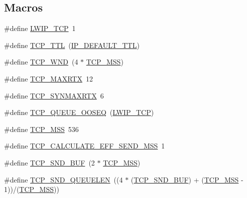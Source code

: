 \subsection*{Macros}
\begin{DoxyCompactItemize}
\item 
\#define \hyperlink{group__lwip__opts__tcp_gaa4ed98deb97b77c633cb8870f34c71e9}{L\+W\+I\+P\+\_\+\+T\+CP}~1
\item 
\#define \hyperlink{group__lwip__opts__tcp_gacd5b25ea81d2894790d25da5393cdab4}{T\+C\+P\+\_\+\+T\+TL}~(\hyperlink{group__lwip__opts__ipv4_ga556b9b58fd02c0fdd126791baef77411}{I\+P\+\_\+\+D\+E\+F\+A\+U\+L\+T\+\_\+\+T\+TL})
\item 
\#define \hyperlink{group__lwip__opts__tcp_ga7f535a6efb5cdf86c3210e35ece1d6a7}{T\+C\+P\+\_\+\+W\+ND}~(4 $\ast$ \hyperlink{group__lwip__opts__tcp_gaf1ab7bb27860aa3677c387a2f3ba317b}{T\+C\+P\+\_\+\+M\+SS})
\item 
\#define \hyperlink{group__lwip__opts__tcp_ga0dee0911197855bdf19ef79778c241a6}{T\+C\+P\+\_\+\+M\+A\+X\+R\+TX}~12
\item 
\#define \hyperlink{group__lwip__opts__tcp_ga50b434a8541a4813f7b27f576c05d1b6}{T\+C\+P\+\_\+\+S\+Y\+N\+M\+A\+X\+R\+TX}~6
\item 
\#define \hyperlink{group__lwip__opts__tcp_ga89ffd0d7d1529bdb26bfbad267d0ad75}{T\+C\+P\+\_\+\+Q\+U\+E\+U\+E\+\_\+\+O\+O\+S\+EQ}~(\hyperlink{group__lwip__opts__tcp_gaa4ed98deb97b77c633cb8870f34c71e9}{L\+W\+I\+P\+\_\+\+T\+CP})
\item 
\#define \hyperlink{group__lwip__opts__tcp_gaf1ab7bb27860aa3677c387a2f3ba317b}{T\+C\+P\+\_\+\+M\+SS}~536
\item 
\#define \hyperlink{group__lwip__opts__tcp_gac04b84d32251ac558f0c3a8af85ba3a5}{T\+C\+P\+\_\+\+C\+A\+L\+C\+U\+L\+A\+T\+E\+\_\+\+E\+F\+F\+\_\+\+S\+E\+N\+D\+\_\+\+M\+SS}~1
\item 
\#define \hyperlink{group__lwip__opts__tcp_ga871d111968d8c6c7880ff36b93c5c4dd}{T\+C\+P\+\_\+\+S\+N\+D\+\_\+\+B\+UF}~(2 $\ast$ \hyperlink{group__lwip__opts__tcp_gaf1ab7bb27860aa3677c387a2f3ba317b}{T\+C\+P\+\_\+\+M\+SS})
\item 
\#define \hyperlink{group__lwip__opts__tcp_ga9beaa47832ead4180981bfbf71074904}{T\+C\+P\+\_\+\+S\+N\+D\+\_\+\+Q\+U\+E\+U\+E\+L\+EN}~((4 $\ast$ (\hyperlink{openmote-cc2538_2lwip_2test_2unit_2lwipopts_8h_a871d111968d8c6c7880ff36b93c5c4dd}{T\+C\+P\+\_\+\+S\+N\+D\+\_\+\+B\+UF}) + (\hyperlink{group__lwip__opts__tcp_gaf1ab7bb27860aa3677c387a2f3ba317b}{T\+C\+P\+\_\+\+M\+SS} -\/ 1))/(\hyperlink{group__lwip__opts__tcp_gaf1ab7bb27860aa3677c387a2f3ba317b}{T\+C\+P\+\_\+\+M\+SS}))

\end{DoxyCompactItemize}
